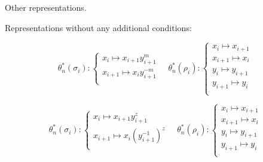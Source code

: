 \documentclass{article}
\begin{document}
Other representations.



Representations without any additional conditions:



\begin{equation}\label{defGV}

\theta_n^*(\sigma_i):

\begin{cases}

x_i \mapsto x_{i+1}y_{i+1}^m\\

x_{i+1} \mapsto x_iy_{i+1}^{-m}\\

\end{cases}\quad

\theta_n^*(\rho_i):

\begin{cases}

x_i \mapsto x_{i+1}\\

x_{i+1} \mapsto x_i\\

y_i \mapsto y_{i+1}\\

y_{i+1} \mapsto y_i\\

\end{cases}

\end{equation}



\begin{equation}\label{defGV}

\theta_n^*(\sigma_i):

\begin{cases}

x_i \mapsto x_{i+1}y_{i+1}^z\\

x_{i+1} \mapsto x_i(y_{i+1}^{-1})^z\\

\end{cases}\quad

\theta_n^*(\rho_i):

\begin{cases}

x_i \mapsto x_{i+1}\\

x_{i+1} \mapsto x_i\\

y_i \mapsto y_{i+1}\\

y_{i+1} \mapsto y_i\\

\end{cases}

\end{equation}
\end{document}
